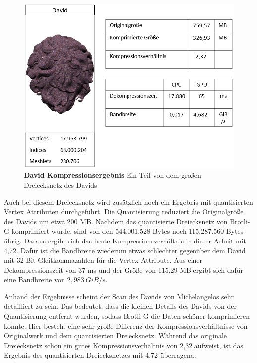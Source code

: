\begin{figure}[htb]
  \centering  
  \includegraphics[scale=0.75]{Bilder/ergebnisse/david.png}
  \caption[David Kompressionsergebnis]{\textbf{David Kompressionsergebnis} Ein Teil von dem großen Dreiecksnetz des Davids }
  \label{fig:david_ergebnis}
\end{figure}

Auch bei diesem Dreiecksnetz wird zusätzlich noch ein Ergebnis mit quantisierten Vertex Attributen durchgeführt.
Die Quantisierung reduziert die Originalgröße des Davids um etwa 200 MB.
Nachdem das quantisierte Dreiecksnetz von Brotli-G komprimiert wurde, sind von den 544.001.528 Bytes noch 115.287.560 Bytes übrig.
Daraus ergibt sich das beste Kompressionsverhältnis in dieser Arbeit mit 4,72.
Dafür ist die Bandbreite wiederum etwas schlechter gegenüber dem David mit 32 Bit Gleitkommazahlen für die Vertex-Attribute.
Aus einer Dekompressionszeit von 37 ms und der Größe von 115,29 MB ergibt sich dafür eine Bandbreite von $\mathit{2,983 \ GiB/s}$. \newline

Anhand der Ergebnisse scheint der Scan des Davids von Michelangelos sehr detailliert zu sein.
Das bedeutet, dass die kleinen Details des Davids von der Quantisierung entfernt wurden, sodass Brotli-G die Daten schöner komprimieren konnte.
Hier besteht eine sehr große Differenz der Kompressionsverhältnisse von Originalwerk und dem quantisierten Dreiecksnetz.
Während das originale Dreiecksnetz schon ein gutes Kompressionsverhältnis von 2,32 aufweist, ist das Ergebnis des quantisierten Dreiecksnetzes mit 4,72 überragend.

